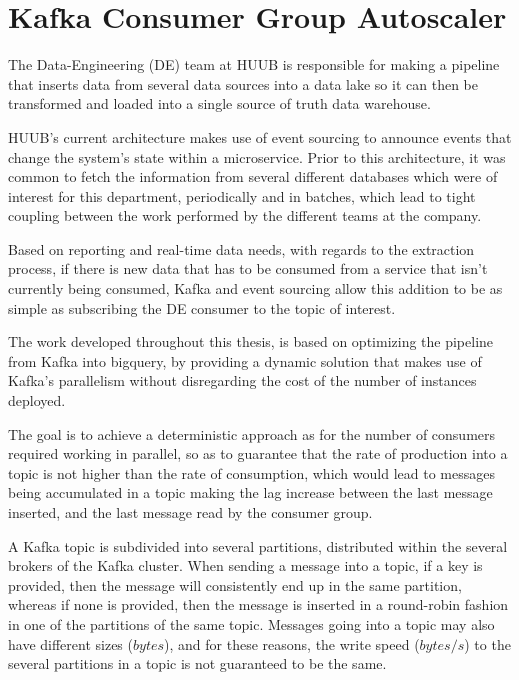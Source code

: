 \chapter{Kafka Consumer Group Autoscaler} \label{chap:chap3}

The Data-Engineering (DE) team at HUUB is responsible for making a pipeline that inserts data from several data sources into a data lake so it can then be transformed and loaded into a single source of truth data warehouse. 

HUUB's current architecture makes use of event sourcing to announce events that change the system's state within a microservice. Prior to this architecture, it was common to fetch the information from several different databases which were of interest for this department, periodically and in batches, which lead to tight coupling between the work performed by the different teams at the company.

Based on reporting and real-time data needs, with regards to the extraction process, if there is new data that has to be consumed from a service that isn't currently being consumed, Kafka and event sourcing allow this addition to be as simple as subscribing the DE consumer to the topic of interest.

The work developed throughout this thesis, is based on optimizing the pipeline from Kafka into bigquery, by providing a dynamic solution that makes use of Kafka's parallelism without disregarding the cost of the number of instances deployed. 

The goal is to achieve a deterministic approach as for the number of consumers required working in parallel, so as to guarantee that the rate of production into a topic is not higher than the rate of consumption, which would lead to messages being accumulated in a topic making the lag increase between the last message inserted, and the last message read by the consumer group.

A Kafka topic is subdivided into several partitions, distributed within the several brokers of the Kafka cluster. When sending a message into a topic, if a key is provided, then the message will consistently end up in the same partition, whereas if none is provided, then the message is inserted in a round-robin fashion in one of the partitions of the same topic. Messages going into a topic may also have different sizes ($bytes$), and for these reasons, the write speed ($bytes/s$) to the several partitions in a topic is not guaranteed to be the same. 

